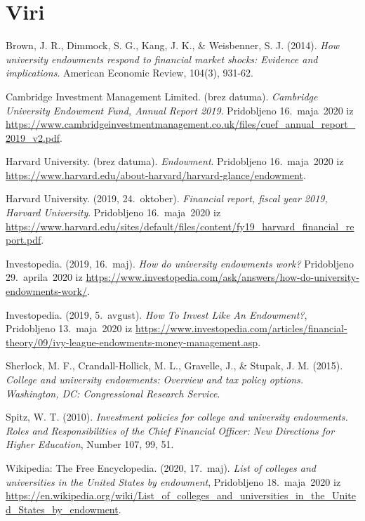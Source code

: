 \documentclass[12pt, a4paper]{article}
\begin{document}
\section[Viri]{Viri}
\begin{thebibliography}{99}

Brown, J. R., Dimmock, S. G., Kang, J. K., \& Weisbenner, S. J. (2014). \textit{How university endowments respond to financial market shocks: Evidence and implications}. American Economic Review, 104(3), 931-62.

Cambridge Investment Management Limited. (brez datuma). \emph{Cambridge University Endowment Fund, Annual Report 2019}. Pridobljeno 16.~maja~2020 iz \url{https://www.cambridgeinvestmentmanagement.co.uk/files/cuef_annual_report_2019_v2.pdf}.

Harvard University. (brez datuma). \emph{Endowment}. Pridobljeno 16.~maja~2020 iz \url{https://www.harvard.edu/about-harvard/harvard-glance/endowment}.

Harvard University. (2019, 24.~oktober). \emph{Financial report, fiscal year 2019, Harvard University}. Pridobljeno 16.~maja~2020 iz \url{https://www.harvard.edu/sites/default/files/content/fy19_harvard_financial_report.pdf}.

Investopedia. (2019, 16.~maj). \emph{How do university endowments work?} Pridobljeno 29.~aprila~2020 iz \url{https://www.investopedia.com/ask/answers/how-do-university-endowments-work/}.

Investopedia. (2019, 5.~avgust). \emph{How To Invest Like An Endowment?}, Pridobljeno 13.~maja~2020 iz \url{https://www.investopedia.com/articles/financial-theory/09/ivy-league-endowments-money-management.asp}.

Sherlock, M. F., Crandall-Hollick, M. L., Gravelle, J., \& Stupak, J. M. (2015). \textit{College and university endowments: Overview and tax policy options. Washington, DC: Congressional Research Service}.

Spitz, W. T. (2010). \emph{Investment policies for college and university endowments. Roles and Responsibilities of the Chief Financial Officer: New Directions for Higher Education}, Number 107, 99, 51.

Wikipedia: The Free Encyclopedia. (2020, 17.~maj). \emph{List of colleges and universities in the United States by endowment},  Pridobljeno 18.~maja~2020 iz \url{https://en.wikipedia.org/wiki/List_of_colleges_and_universities_in_the_United_States_by_endowment}.

\end{thebibliography}
\end{document}
